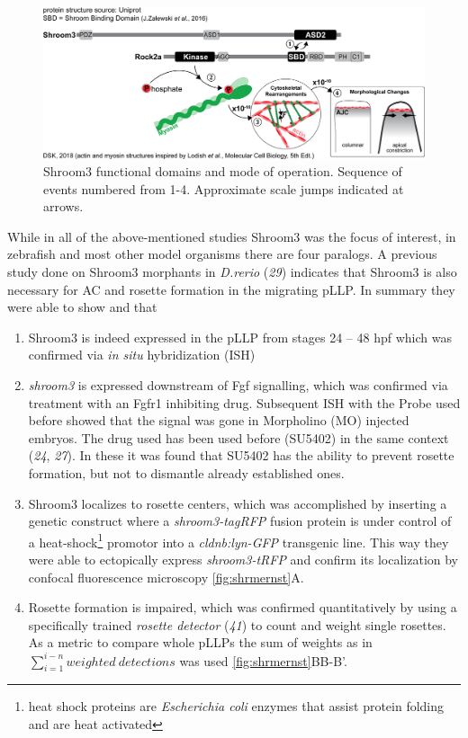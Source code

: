 \documentclass[11pt,singlespacinge,twoside]{reedthesis} %
\providecommand{\tightlist}{%
  \setlength{\itemsep}{0pt}\setlength{\parskip}{0pt}}
\def\labelenumi{\arabic{enumi}.}
\begin{document}
\begin{figure}

{\centering \includegraphics[width=.95\textwidth]{figures/intro/shrm3_interaction} 

}

\caption[Shroom3 functional domains and mode of operation]{Shroom3 functional domains and mode of operation. Sequence of events numbered from 1-4. Approximate scale jumps indicated at arrows.}\label{fig:shrminteract}
\end{figure}
While in all of the above-mentioned studies Shroom3 was the focus of interest, in zebrafish and most other model organisms there are four paralogs. A previous study done on Shroom3 morphants in \emph{D.rerio} (\emph{29}) indicates that Shroom3 is also necessary for AC and rosette formation in the migrating pLLP. In summary they were able to show and that
\begin{enumerate}
\def\labelenumi{\arabic{enumi}.}
\tightlist
\item
  Shroom3 is indeed expressed in the pLLP from stages 24 -- 48 hpf which was confirmed via \emph{in situ} hybridization (ISH)
\item
  \emph{shroom3} is expressed downstream of Fgf signalling, which was confirmed via treatment with an Fgfr1 inhibiting drug. Subsequent ISH with the Probe used before showed that the signal was gone in Morpholino (MO) injected embryos. The drug used has been used before (SU5402) in the same context (\emph{24}, \emph{27}). In these it was found that SU5402 has the ability to prevent rosette formation, but not to dismantle already established ones.
\item
  Shroom3 localizes to rosette centers, which was accomplished by inserting a genetic construct where a \emph{shroom3-tagRFP} fusion protein is under control of a heat-shock\footnote{heat shock proteins are \emph{Escherichia coli} enzymes that assist protein folding and are heat activated} promotor into a \emph{cldnb:lyn-GFP} transgenic line. This way they were able to ectopically express \emph{shroom3-tRFP} and confirm its localization by confocal fluorescence microscopy \ref{fig:shrmernst}A.
\item
  Rosette formation is impaired, which was confirmed quantitatively by using a specifically trained \emph{rosette detector} (\emph{41}) to count and weight single rosettes. As a metric to compare whole pLLPs the sum of weights as in \(\sum_{i=1}^{i-n}{weighted\ detections}\) was used \ref{fig:shrmernst}BB-B'.
\end{enumerate}
\end{document}
